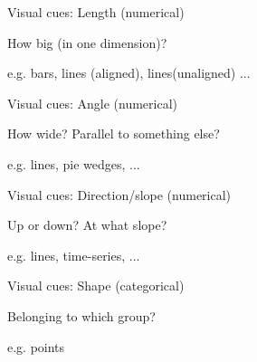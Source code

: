 \documentclass[table]{beamer}\usepackage[]{graphicx}\usepackage[]{color}
\begin{document}

\begin{frame}[fragile]{Visual cues: Length (numerical)}

\begin{block}{How big (in one dimension)?}

e.g. bars, lines (aligned), lines(unaligned) ...

\end{block}

\vspace{15em}

\end{frame}



\begin{frame}[fragile]{Visual cues: Angle (numerical)}

\begin{block}{How wide? Parallel to something else?}

e.g. lines, pie wedges, ...

\end{block}

\vspace{15em}

\end{frame}


\begin{frame}[fragile]{Visual cues: Direction/slope (numerical)}

\begin{block}{Up or down? At what slope?}

e.g. lines, time-series, ...

\end{block}

\vspace{15em}

\end{frame}


\begin{frame}[fragile]{Visual cues: Shape (categorical)}

\begin{block}{Belonging to which group?}

e.g. points

\end{block}

\vspace{15em}

\end{frame}
\end{document}
